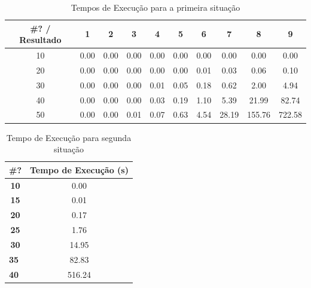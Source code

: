 \documentclass[
12pt,
a4paper,
twoside,
brazil
]{article}
\begin{document}
	\begin{table}[H]
		\centering
		\caption{Tempos de Execução para a primeira situação}
		\label{table_sequencial}
		\begin{tabular}{|c|c|c|c|c|c|c|c|c|c|}
			\hline
			\#? / Resultado & \textbf{1} & \textbf{2} & \textbf{3} & \textbf{4} & \textbf{5} & 6    & 7     & 8      & 9      \\ \hline
			10              & 0.00       & 0.00       & 0.00       & 0.00       & 0.00       & 0.00 & 0.00  & 0.00   & 0.00   \\ \hline
			20              & 0.00       & 0.00       & 0.00       & 0.00       & 0.00       & 0.01 & 0.03  & 0.06   & 0.10   \\ \hline
			30              & 0.00       & 0.00       & 0.00       & 0.01       & 0.05       & 0.18 & 0.62  & 2.00   & 4.94   \\ \hline
			40              & 0.00       & 0.00       & 0.00       & 0.03       & 0.19       & 1.10 & 5.39  & 21.99  & 82.74  \\ \hline
			50              & 0.00       & 0.00       & 0.01       & 0.07       & 0.63       & 4.54 & 28.19 & 155.76 & 722.58 \\ \hline
		\end{tabular}
	\end{table}

	\begin{table}[H]
		\centering
		\caption{Tempo de Execução para segunda situação}
		\label{tabela_alternada}
		\begin{tabular}{|c|c|}
			\hline
			\textbf{\#?}                      & \textbf{Tempo de Execução (s)} \\ \hline
			\textbf{10}                       & 0.00                           \\ \hline
			\textbf{15}                       & 0.01                           \\ \hline
			\textbf{20}                       & 0.17                           \\ \hline
			\textbf{25}                       & 1.76                           \\ \hline
			\textbf{30}                       & 14.95                          \\ \hline
			\multicolumn{1}{|l|}{\textbf{35}} & 82.83                          \\ \hline
			\multicolumn{1}{|l|}{\textbf{40}} & 516.24                         \\ \hline
		\end{tabular}
	\end{table}
	
\end{document}
